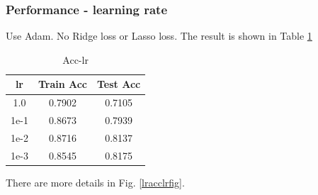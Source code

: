 \documentclass{article}
\begin{document}
\subsubsection{Performance - learning rate}
Use Adam. No Ridge loss or Lasso loss. The result is shown in Table \ref{lracclr}
\begin{table}[H]
    \centering
    \caption {Acc-lr}
    \label {lracclr}
    \begin{tabular}{c|c|c}
        \hline 
        lr & Train Acc & Test Acc\\
        \hline
        1.0 &  0.7902 & 0.7105\\
        1e-1 & 0.8673 & 0.7939 \\
        1e-2 & 0.8716 & 0.8137 \\
        1e-3 & 0.8545 & 0.8175 \\
        \hline
    \end{tabular}
\end{table}
There are more details in Fig. \ref{lracclrfig}.
\end{document}
